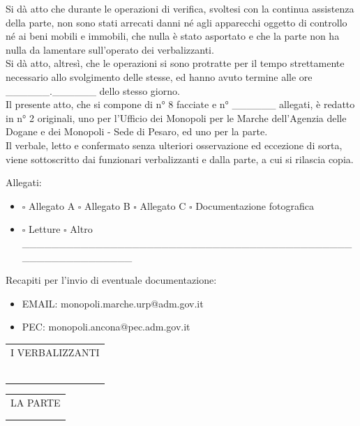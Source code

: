 \documentclass[12pt]{article}
\makeatletter
\newcommand\signature{%
  \par\vspace{8ex}\noindent
  \begin{tabular}[t]{@{}c@{}}
    I VERBALIZZANTI\\ \\
    \makebox[15em]{\dotfill}\\
    \\
    \makebox[15em]{\dotfill}\\
    \\
    \makebox[15em]{\dotfill}
  \end{tabular}
  \hfill
  \begin{tabular}[t]{@{}c@{}}
    LA PARTE\\ \\
    \makebox[15em]{\dotfill}
  \end{tabular}
}
\makeatother
\begin{document}
Si dà atto che durante le operazioni di verifica, svoltesi con la continua assistenza della parte, non sono stati arrecati danni né agli apparecchi oggetto di controllo né ai beni mobili e immobili, che nulla è stato asportato e che la parte non ha nulla da lamentare sull’operato dei verbalizzanti.\\
Si dà atto, altresì, che le operazioni si sono protratte per il tempo strettamente necessario allo svolgimento delle stesse, ed hanno avuto termine alle ore \_\_\_\_\_\_.\_\_\_\_\_\_ dello stesso giorno.\\
Il presente atto, che si compone di n° 8 facciate e n° \_\_\_\_\_\_ allegati, è redatto in n° 2 originali, uno per l’Ufficio dei Monopoli per le Marche dell’Agenzia delle Dogane e dei Monopoli - Sede di Pesaro, ed uno per la parte.\\
Il verbale, letto e confermato senza ulteriori osservazione ed eccezione di sorta, viene sottoscritto dai funzionari verbalizzanti e dalla parte, a cui si rilascia copia.

Allegati: 
\begin{itemize}[label={}]
    \item \begin{math}\square\end{math} Allegato A \begin{math}\square\end{math} Allegato B \begin{math}\square\end{math} Allegato C \begin{math}\square\end{math} Documentazione fotografica
    \item \begin{math}\square\end{math} Letture \begin{math}\square\end{math} Altro \_\_\_\_\_\_\_\_\_\_\_\_\_\_\_\_\_\_\_\_\_\_\_\_\_\_\_\_\_\_\_\_\_\_\_\_\_\_\_\_\_\_\_\_\_\_\_\_\_\_\_\_\_\_\_\_\_\_\_\_
\end{itemize}

Recapiti per l'invio di eventuale documentazione:
\begin{itemize}[label={}]
    \item EMAIL: monopoli.marche.urp@adm.gov.it
    \item PEC: monopoli.ancona@pec.adm.gov.it
\end{itemize}

\signature
\end{document}

